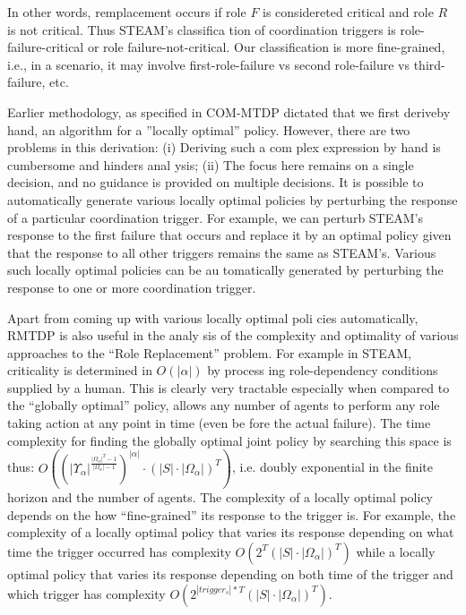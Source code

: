 \documentclass{IEEEtran}
\begin{document}
In other words, remplacement occurs if role $F$ is considereted critical and role $R$ is not critical. Thus STEAM's classifica
tion of coordination triggers is role-failure-critical or role
failure-not-critical. Our classification is more fine-grained,
 i.e., in a scenario, it may involve first-role-failure vs second
role-failure vs third-failure, etc.

 Earlier methodology, as specified in COM-MTDP \cite{Pynadath} dictated that we first deriveby hand, an
 algorithm for a ”locally optimal” policy. However, there are
 two problems in this derivation: (i) Deriving such a com
plex expression by hand is cumbersome and hinders anal
ysis; (ii) The focus here remains on a single decision, and
 no guidance is provided on multiple decisions. It is possible
 to automatically generate various locally optimal policies by
 perturbing the response of a particular coordination trigger.
 For example, we can perturb STEAM's response to the first
 failure that occurs and replace it by an optimal policy given
 that the response to all other triggers remains the same as
 STEAM's. Various such locally optimal policies can be au
tomatically generated by perturbing the response to one or
 more coordination trigger.

  Apart from coming up with various locally optimal poli
cies automatically, RMTDP is also useful in the analy
sis of the complexity and optimality of various approaches
 to the “Role Replacement” problem. For example in
 STEAM, criticality is determined in $O(|\alpha|)$ by process
ing role-dependency conditions supplied by a human. This
 is clearly very tractable especially when compared to the
 “globally optimal” policy, allows any number of agents to
 perform any role taking action at any point in time (even be
fore the actual failure). The time complexity for finding the
 globally optimal joint policy by searching this space is thus: $O((|\Upsilon_\alpha|^\frac{|\Omega_\alpha|^T-1}{|\Omega_\alpha|-1})^{|\alpha|}\cdot(|S|\cdot|\Omega_\alpha|)^T)$, i.e. doubly  exponential in the finite horizon and the number of agents. The complexity of a locally optimal policy depends on the how “fine-grained” its response to the trigger is. For example,
 the complexity of a locally optimal policy that varies its
 response depending on what time the trigger occurred has
 complexity $O(2^T(|S|\cdot|\Omega_\alpha|)^T)$ while a locally optimal policy that varies its response depending on both time of the trigger and which trigger has complexity $O(2^{|trigger_s|*T}(|S|\cdot|\Omega_\alpha|)^T)$.
\end{document}
